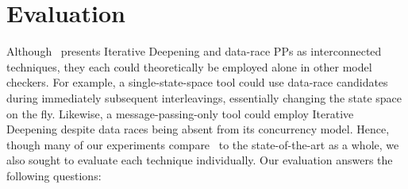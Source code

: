 
\section{Evaluation}

Although \quicksand~presents Iterative Deepening and data-race PPs as interconnected techniques, they each could theoretically be employed alone in other model checkers.
For example, a single-state-space tool could use data-race candidates during immediately subsequent interleavings, essentially changing the state space on the fly.
Likewise, a message-passing-only tool could employ Iterative Deepening despite data races being absent from its concurrency model.
Hence, though many of our experiments compare \quicksand~to the state-of-the-art as a whole,
we also sought to evaluate each technique individually.
Our evaluation answers the following questions:
